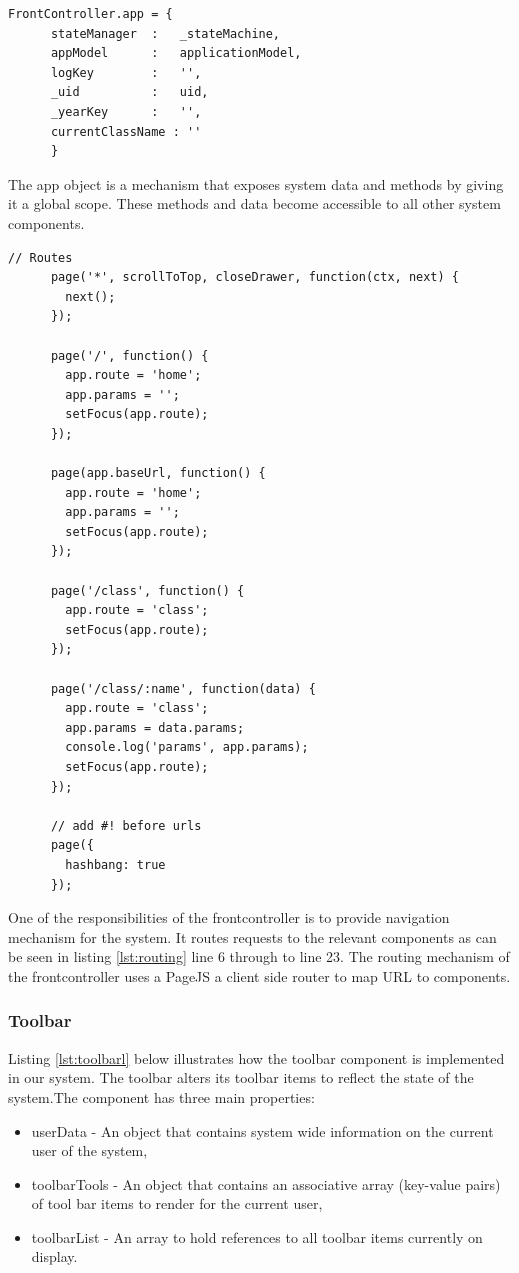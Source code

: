 \begin{lstlisting}[caption={Frontcontroller app model}, label={lst:FrontControllerAppModel}]
    FrontController.app = {
      stateManager  :   _stateMachine,
      appModel      :   applicationModel,
      logKey        :   '',
      _uid          :   uid,
      _yearKey      :   '',
      currentClassName : ''
      }
\end{lstlisting}
The app object is a mechanism that exposes system data and methods by giving it a global scope. These methods and data become accessible to all other system components.

\begin{lstlisting}[caption={Routing by frontcontroller}, label={lst:routing}]
    // Routes
      page('*', scrollToTop, closeDrawer, function(ctx, next) {
        next();
      });

      page('/', function() {
        app.route = 'home';
        app.params = '';
        setFocus(app.route);
      });

      page(app.baseUrl, function() {
        app.route = 'home';
        app.params = '';
        setFocus(app.route);
      });

      page('/class', function() {
        app.route = 'class';
        setFocus(app.route);
      });

      page('/class/:name', function(data) {
        app.route = 'class';
        app.params = data.params;
        console.log('params', app.params);
        setFocus(app.route);
      });

      // add #! before urls
      page({
        hashbang: true
      });
\end{lstlisting}

One of the responsibilities of the frontcontroller is to provide navigation mechanism for the system. It routes requests to the relevant components as can be seen in listing \ref{lst:routing} line 6 through to line 23. The routing mechanism of the frontcontroller uses a PageJS \cite{website:VisionMedia} a client side router to map URL to components.  

\subsubsection{Toolbar}
Listing \ref{lst:toolbarl} below illustrates how the toolbar component is implemented in our system. The toolbar alters its toolbar items to reflect the state of the system.The component has three main properties:
\begin{itemize}
    \item userData - An object that contains system wide information on the current user of the system,
    \item toolbarTools - An object that contains an associative array (key-value pairs) of tool bar items to render for the current user,
    \item toolbarList - An array to hold references to all toolbar items currently on display. 
\end{itemize}

